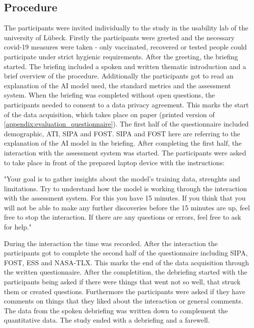 \documentclass[11pt,a4paper,english]{scrreprt}
\begin{document}
\subsection{Procedure}\label{subsection:procedure}
The participants were invited individually to the study in the usability lab of the university of Lübeck. Firstly the participants were greeted and the necessary covid-19 measures were taken - only vaccinated, recovered or tested people could participate under strict hygienic requirements. After the greeting, the briefing started. The briefing included a spoken and written thematic introduction and a brief overview of the procedure. Additionally the participants got to read an explanation of the AI model used, the standard metrics and the assessment system. When the briefing was completed without open questions, the participants needed to consent to a data privacy agreement. This marks the start of the data acquisition, which takes place on paper (printed version of \autoref{appendix:evaluation_questionnaire}). The first half of the questionnaire included demographic, ATI, SIPA and FOST. SIPA and FOST here are referring to the explanation of the AI model in the briefing. After completing the first half, the interaction with the assessment system was started. The participants were asked to take place in front of the prepared laptop device with the instructions:

\begin{displayquote}
    "Your goal is to gather insights about the model’s training data, strenghts and limitations. Try to understand how the model is working through the interaction with the assessment system. For this you have 15 minutes. If you think that you will not be able to make any further discoveries before the 15 minutes are up, feel free to stop the interaction. If there are any questions or errors, feel free to ask for help."
\end{displayquote}

During the interaction the time was recorded. After the interaction the participants got to complete the second half of the questionnaire including SIPA, FOST, ESS and NASA-TLX. This marks the end of the data acquisition through the written questionnaire. After the completition, the debriefing started with the participants being asked if there were things that went not so well, that struck them or created questions. Furthermore the participants were asked if they have comments on things that they liked about the interaction or general comments. The data from the spoken debriefing was written down to complement the quantitative data. The study ended with a debriefing and a farewell.
\end{document}
